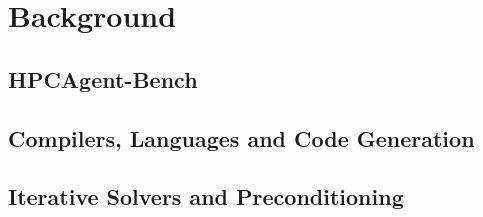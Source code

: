 \chapter{Background}
\label{ch:background}

\section{HPCAgent-Bench}

\section{Compilers, Languages and Code Generation}

\section{Iterative Solvers and Preconditioning}
